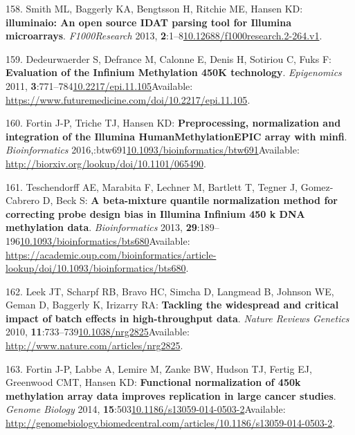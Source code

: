 \documentclass[
]{book}
\begin{document}
\leavevmode\hypertarget{ref-Smith2013}{}%
158. Smith ML, Baggerly KA, Bengtsson H, Ritchie ME, Hansen KD: \textbf{illuminaio: An open source IDAT parsing tool for Illumina microarrays}. \emph{F1000Research} 2013, \textbf{2}:1--8\href{https://doi.org/10.12688/f1000research.2-264.v1}{10.12688/f1000research.2-264.v1}.

\leavevmode\hypertarget{ref-Dedeurwaerder2011}{}%
159. Dedeurwaerder S, Defrance M, Calonne E, Denis H, Sotiriou C, Fuks F: \textbf{Evaluation of the Infinium Methylation 450K technology}. \emph{Epigenomics} 2011, \textbf{3}:771--784\href{https://doi.org/10.2217/epi.11.105}{10.2217/epi.11.105}Available: \url{https://www.futuremedicine.com/doi/10.2217/epi.11.105}.

\leavevmode\hypertarget{ref-Fortin2016}{}%
160. Fortin J-P, Triche TJ, Hansen KD: \textbf{Preprocessing, normalization and integration of the Illumina HumanMethylationEPIC array with minfi}. \emph{Bioinformatics} 2016,:btw691\href{https://doi.org/10.1093/bioinformatics/btw691}{10.1093/bioinformatics/btw691}Available: \url{http://biorxiv.org/lookup/doi/10.1101/065490}.

\leavevmode\hypertarget{ref-Teschendorff2013}{}%
161. Teschendorff AE, Marabita F, Lechner M, Bartlett T, Tegner J, Gomez-Cabrero D, Beck S: \textbf{A beta-mixture quantile normalization method for correcting probe design bias in Illumina Infinium 450 k DNA methylation data}. \emph{Bioinformatics} 2013, \textbf{29}:189--196\href{https://doi.org/10.1093/bioinformatics/bts680}{10.1093/bioinformatics/bts680}Available: \url{https://academic.oup.com/bioinformatics/article-lookup/doi/10.1093/bioinformatics/bts680}.

\leavevmode\hypertarget{ref-Leek2010}{}%
162. Leek JT, Scharpf RB, Bravo HC, Simcha D, Langmead B, Johnson WE, Geman D, Baggerly K, Irizarry RA: \textbf{Tackling the widespread and critical impact of batch effects in high-throughput data}. \emph{Nature Reviews Genetics} 2010, \textbf{11}:733--739\href{https://doi.org/10.1038/nrg2825}{10.1038/nrg2825}Available: \url{http://www.nature.com/articles/nrg2825}.

\leavevmode\hypertarget{ref-Fortin2014}{}%
163. Fortin J-P, Labbe A, Lemire M, Zanke BW, Hudson TJ, Fertig EJ, Greenwood CMT, Hansen KD: \textbf{Functional normalization of 450k methylation array data improves replication in large cancer studies}. \emph{Genome Biology} 2014, \textbf{15}:503\href{https://doi.org/10.1186/s13059-014-0503-2}{10.1186/s13059-014-0503-2}Available: \url{http://genomebiology.biomedcentral.com/articles/10.1186/s13059-014-0503-2}.
\end{document}
